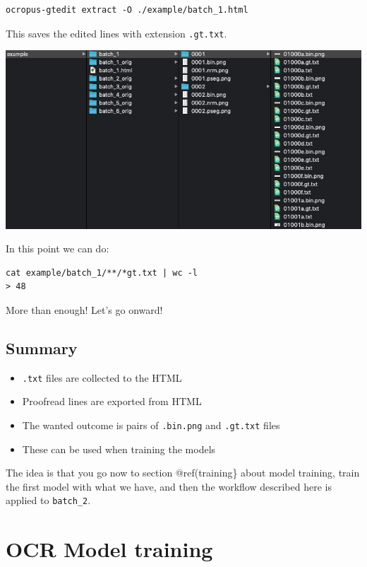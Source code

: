 \documentclass[]{book}
\providecommand{\tightlist}{%
  \setlength{\itemsep}{0pt}\setlength{\parskip}{0pt}}
\begin{document}
\begin{verbatim}
ocropus-gtedit extract -O ./example/batch_1.html
\end{verbatim}

This saves the edited lines with extension \texttt{.gt.txt}.

\includegraphics{./images/ocropy_export_gt.jpg}

In this point we can do:

\begin{verbatim}
cat example/batch_1/**/*gt.txt | wc -l
> 48
\end{verbatim}

More than enough! Let's go onward!

\hypertarget{summary}{%
\section{Summary}\label{summary}}

\begin{itemize}
\tightlist
\item
  \texttt{.txt} files are collected to the HTML
\item
  Proofread lines are exported from HTML
\item
  The wanted outcome is pairs of \texttt{.bin.png} and \texttt{.gt.txt} files
\item
  These can be used when training the models
\end{itemize}

The idea is that you go now to section @ref(training\} about model training, train the first model with what we have, and then the workflow described here is applied to \texttt{batch\_2}.

\hypertarget{training}{%
\chapter{OCR Model training}\label{training}}
\end{document}
